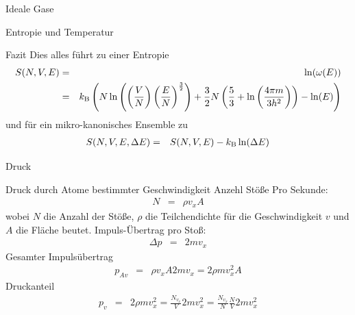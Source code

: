 \begin{chapter}{\titlestr}
\begin{section}{Ideale Gase}
\begin{subsection}{Entropie und Temperatur}
\begin{subsubsection}{Fazit}
Dies alles führt zu einer Entropie
\begin{eqnarray}
\label{ln_omega}
S(N,V,E) &=& \ln(\omega(E))\cr
&=& k_{\mathrm{B}}\left( N \ln \left( \left(\frac VN\right) \left(\frac EN \right)^{\frac 32}\right)+ {\frac 32}N\left( {\frac 53}+ \ln\left(\frac{4\pi m}{3h^2}\right)\right)-\ln(E)\right)
\end{eqnarray}
und für ein mikro-kanonisches Ensemble zu
\begin{eqnarray*}
S(N,V,E, \Delta E) &=& S(N,V,E)-k_{\mathrm{B}}\ln(\Delta E)
\end{eqnarray*}

\end{subsubsection}

\end{subsection}

\begin{subsection}{Druck}
\begin{subsubsection}{Druck durch Atome bestimmter Geschwindigkeit}
Anzehl Stöße Pro Sekunde:
\begin{eqnarray*}
N &=& \rho v_xA
\end{eqnarray*}
wobei $N$ die Anzahl der Stöße, $\rho$ die Teilchendichte für die Geschwindigkeit $v$ und $A$ die Fläche beutet.
Impuls-Übertrag pro Stoß:
\begin{eqnarray*}
\Delta p &=& 2mv_x
\end{eqnarray*}
Gesamter Impulsübertrag
\begin{eqnarray*}
p_{Av} &=& \rho v_xA2mv_x = 2\rho mv_x^2A
\end{eqnarray*}
Druckanteil
\begin{eqnarray*}
p_v &=& 2\rho mv_x^2 =\frac{N_{v_x}}{V}2mv_x^2=\frac{N_{v_x}}{N}\frac{N}{V}2mv_x^2
\end{eqnarray*}
\end{subsubsection}


\end{subsection}
\end{section}
\end{chapter}
